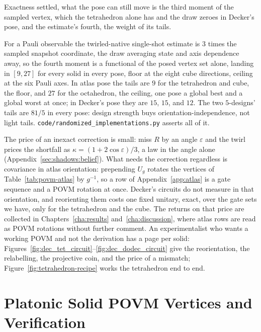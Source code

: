 \documentclass[11pt, oneside, openany]{scrbook}
\begin{document}
Exactness settled, what the pose can still move is the third moment of the sampled vertex, which the tetrahedron alone has and the draw zeroes in Decker's pose, and the estimate's fourth, the weight of its tails.

For a Pauli observable the twirled-native single-shot estimate is $3$ times the sampled snapshot coordinate, the draw averaging state and axis dependence away, so the fourth moment is a functional of the posed vertex set alone, landing in $[9, 27]$ for every solid in every pose, floor at the eight cube directions, ceiling at the six Pauli axes. In atlas pose the tails are $9$ for the tetrahedron and cube, the floor, and $27$ for the octahedron, the ceiling, one pose a global best and a global worst at once; in Decker's pose they are $15$, $15$, and $12$. The two $5$-designs' tails are $81/5$ in every pose: design strength buys orientation-independence, not light tails. \texttt{code/randomized\_implementations.py} asserts all of it.

The price of an inexact correction is small: miss $R$ by an angle $\varepsilon$ and the twirl prices the shortfall as $\kappa = (1 + 2\cos\varepsilon)/3$, a law in the angle alone (Appendix~\ref{sec:shadows:belief}). What needs the correction regardless is covariance in atlas orientation: prepending $U_g$ rotates the vertices of Table~\ref{tab:povm-atlas} by $g^{-1}$, so a row of Appendix~\ref{app:atlas} is a gate sequence and a POVM rotation at once. Decker's circuits do not measure in that orientation, and reorienting them costs one fixed unitary, exact, over the gate sets we have, only for the tetrahedron and the cube. The returns on that price are collected in Chapters~\ref{cha:results} and~\ref{cha:discussion}, where atlas rows are read as POVM rotations without further comment. An experimentalist who wants a working POVM and not the derivation has a page per solid: Figures~\ref{fig:dec_tet_circuit}--\ref{fig:dec_dodec_circuit} give the reorientation, the relabelling, the projective coin, and the price of a mismatch; Figure~\ref{fig:tetrahedron-recipe} works the tetrahedron end to end.

\chapter{Platonic Solid POVM Vertices and Verification} \label{app:povm-atlas}
\end{document}
